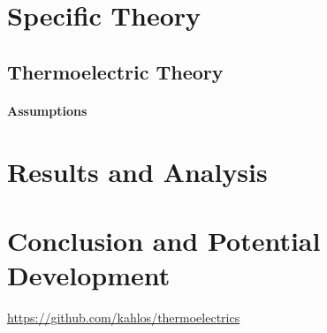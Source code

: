 \documentclass[12pt,draft]{article}
\begin{document}
\section{Specific Theory}
\subsection{Thermoelectric Theory}
\paragraph{Assumptions}

\section{Results and Analysis}

\section{Conclusion and Potential Development}

\url{https://github.com/kahlos/thermoelectrics}
\end{document}
